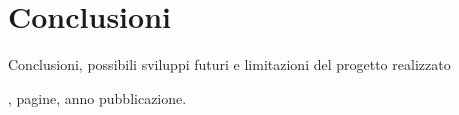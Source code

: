 \documentclass[conference]{IEEEtran}
\begin{document}
\section{Conclusioni}
Conclusioni, possibili sviluppi futuri e limitazioni del progetto realizzato


\begin{thebibliography}{15}

, pagine, anno pubblicazione.

\end{thebibliography}
\end{document}
